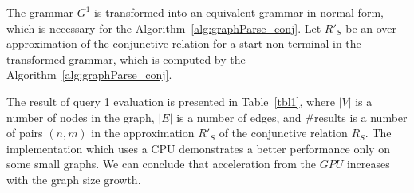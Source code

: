 %    
%    


The grammar $G^1$ is transformed into an equivalent grammar in normal form, which is necessary for the Algorithm~\ref{alg:graphParse_conj}. Let $R'_S$ be an over-approximation of the conjunctive relation for a start non-terminal in the transformed grammar, which is computed by the Algorithm~\ref{alg:graphParse_conj}.

The result of query 1 evaluation is presented in Table~\ref{tbl1}, where $|V|$ is a number of nodes in the graph, $|E|$ is a number of edges, and \#results is a number of pairs $(n,m)$ in the approximation $R'_S$ of the conjunctive relation $R_S$. The implementation which uses a CPU demonstrates a better performance only on some small graphs. We can conclude that acceleration from the $GPU$ increases with the graph size growth.

